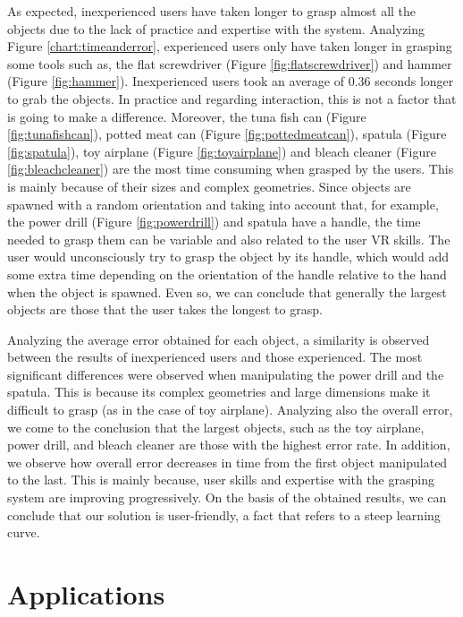 As expected, inexperienced users have taken longer to grasp almost all the objects due to the lack of practice and expertise with the system. Analyzing Figure \ref{chart:timeanderror}, experienced users only have taken longer in grasping some tools such as, the flat screwdriver (Figure \ref{fig:flatscrewdriver}) and hammer (Figure \ref{fig:hammer}). Inexperienced users took an average of 0.36 seconds longer to grab the objects. In practice and regarding interaction, this is not a factor that is going to make a difference. Moreover, the tuna fish can (Figure \ref{fig:tunafishcan}), potted meat can (Figure \ref{fig:pottedmeatcan}), spatula (Figure \ref{fig:spatula}), toy airplane (Figure \ref{fig:toyairplane}) and bleach cleaner (Figure \ref{fig:bleachcleaner}) are the most time consuming when grasped by the users. This is mainly because of their sizes and complex geometries. Since objects are spawned with a random orientation and taking into account that, for example, the power drill (Figure \ref{fig:powerdrill}) and spatula have a handle, the time needed to grasp them can be variable and also related to the user VR skills. The user would unconsciously try to grasp the object by its handle, which would add some extra time depending on the orientation of the handle relative to the hand when the object is spawned. Even so, we can conclude that generally the largest objects are those that the user takes the longest to grasp.

Analyzing the average error obtained for each object, a similarity is observed between the results of inexperienced users and those experienced. The most significant differences were observed when manipulating the power drill and the spatula. This is because its complex geometries and large dimensions make it difficult to grasp (as in the case of toy airplane). Analyzing also the overall error, we come to the conclusion that the largest objects, such as the toy airplane, power drill, and bleach cleaner are those with the highest error rate. In addition, we observe how overall error decreases in time from the first object manipulated to the last. This is mainly because, user skills and expertise with the grasping system are improving progressively. On the basis of the obtained results, we can conclude that our solution is user-friendly, a fact that refers to a steep learning curve.


\section{Applications}
\label{sec:applications}

